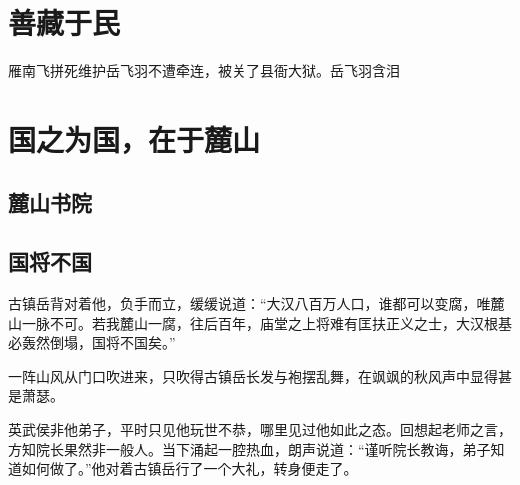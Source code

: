 \chapter{善藏于民}
雁南飞拼死维护岳飞羽不遭牵连，被关了县衙大狱。岳飞羽含泪

\section{}
\section{}
\section{}
\section{}



\chapter{国之为国，在于麓山}
\section{麓山书院}


\section{国将不国}
古镇岳背对着他，负手而立，缓缓说道：“大汉八百万人口，谁都可以变腐，唯麓山一脉不可。若我麓山一腐，往后百年，庙堂之上将难有匡扶正义之士，大汉根基必轰然倒塌，国将不国矣。”

一阵山风从门口吹进来，只吹得古镇岳长发与袍摆乱舞，在飒飒的秋风声中显得甚是萧瑟。

英武侯非他弟子，平时只见他玩世不恭，哪里见过他如此之态。回想起老师之言，方知院长果然非一般人。当下涌起一腔热血，朗声说道：“谨听院长教诲，弟子知道如何做了。”他对着古镇岳行了一个大礼，转身便走了。

\section{}
\section{}


